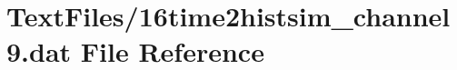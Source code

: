 \hypertarget{16time2histsim__channel9_8dat}{}\section{Text\+Files/16time2histsim\+\_\+channel9.dat File Reference}
\label{16time2histsim__channel9_8dat}
